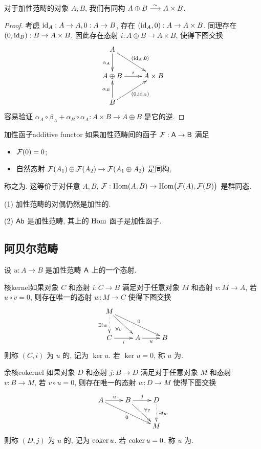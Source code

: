 \begin{proposition}{}{}
对于加性范畴的对象 $A,B$, 我们有同构 $A\oplus B\stackrel{\sim}{\longrightarrow} A\times B$.
\end{proposition}
\begin{proof}
考虑 ${\mathrm{id}}_A:A\to A,0:A\to B$, 存在 $({\mathrm{id}}_A,0):A\to A\times B$. 同理存在 $(0,{\mathrm{id}}_B):B\to A\times B$. 因此存在态射 $i:A\oplus B\to A\times B$, 使得下图交换
  \[\xymatrix{
    A\ar[rd]^{(\id_A,0)}\ar[d]_{\alpha_A}&\\
    A\oplus B\ar[r]^i&A\times B\\
    B\ar[u]^{\alpha_B}\ar[ru]_{(0,\id_B)}
  }\]
容易验证 $\alpha_A\circ \beta_A+\alpha_B\circ\alpha_A:A\times B\to A\oplus B$ 是它的逆.
\end{proof}

\begin{definition}{加性函子}{additive functor}
如果加性范畴间的函子 ${\mathcal{F}}:{\mathsf{A}}\to {\mathsf{B}}$ 满足
\begin{itemize}
\item ${\mathcal{F}}(0)=0$;
\item 自然态射 ${\mathcal{F}}(A_1)\oplus{\mathcal{F}}(A_2)\to {\mathcal{F}}(A_1\oplus A_2)$ 是同构,
\end{itemize}
称之为. 这等价于对任意 $A,B$, ${\mathcal{F}}:{\mathrm{Hom}}(A,B)\to{\mathrm{Hom}}\bigl({\mathcal{F}}(A),{\mathcal{F}}(B)\bigr)$ 是群同态.
\end{definition}

\begin{example}
(1) 加性范畴的对偶仍然是加性的.

(2) ${\mathsf{Ab}}$ 是加性范畴, 其上的 ${\mathrm{Hom}}$ 函子是加性函子.
\end{example}


\subsection{阿贝尔范畴}\label{subsec:abelian_category}

设 $u:A\to B$ 是加性范畴 ${\mathsf{A}}$ 上的一个态射. 

\begin{definition}{核}{kernel}如果对象 $C$ 和态射 $i:C\to B$ 满足对于任意对象 $M$ 和态射 $v: M\to A$, 若 $u\circ v=0$, 则存在唯一的态射 $w:M\to C$ 使得下图交换
  \[\xymatrix{
M\ar@{.>}[d]_{\exists! w}\ar[rd]_{\forall v} \ar[rrd]^0&&\\
C\ar[r]_i &A\ar[r]_u &B
}\]
则称 $(C,i)$ 为 $u$ 的, 记为 $\ker u$. 若 $\ker u=0$, 称 $u$ 为.
\end{definition}

\begin{definition}{余核}{cokernel}
如果对象 $D$ 和态射 $j:B\to D$ 满足对于任意对象 $M$ 和态射 $v: B\to M$, 若 $v\circ u=0$, 则存在唯一的态射 $w:D\to M$ 使得下图交换
  \[\xymatrix{
A\ar[r]^u \ar[rrd]_0&B\ar[rd]^{\forall v}\ar[r]^j&D\ar@{.>}[d]^{\exists! w}\\
&&M\\
}\]
则称 $(D,j)$ 为 $u$ 的, 记为 ${\mathrm{coker}\,} u$. 若 ${\mathrm{coker}\,} u=0$, 称 $u$ 为.
\end{definition}

